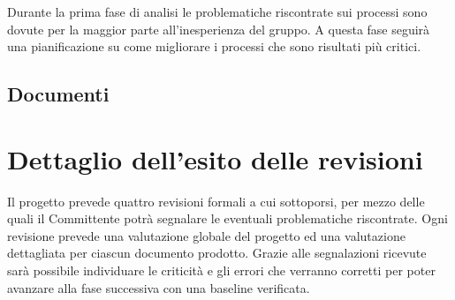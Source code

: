\documentclass[a4paper]{report}
\begin{document}
				Durante la prima fase di analisi le problematiche riscontrate sui processi sono dovute per la maggior parte 
				all'inesperienza del gruppo. A questa fase seguirà una pianificazione su come migliorare i processi che sono 
				risultati più critici.
				
			\subsection{Documenti}
		\section{Dettaglio dell'esito delle revisioni}
			Il progetto prevede quattro revisioni formali a cui sottoporsi, per mezzo delle quali il Committente potrà segnalare 
			le eventuali problematiche riscontrate. Ogni revisione prevede una valutazione globale del progetto ed una valutazione 
			dettagliata per ciascun documento prodotto. Grazie alle segnalazioni ricevute sarà possibile individuare le criticità 
			e gli errori che verranno corretti per poter avanzare alla fase successiva con una baseline verificata.
	
\end{document}
